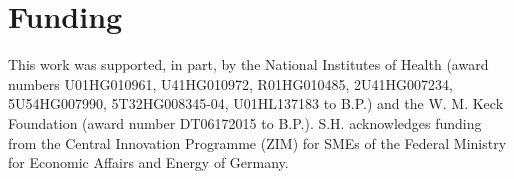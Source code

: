 \documentclass{bioinfo}
\begin{document}
%

\section*{Funding}

This work was supported, in part, by the National Institutes of Health (award numbers U01HG010961, U41HG010972, R01HG010485, 2U41HG007234, 5U54HG007990, 5T32HG008345-04, U01HL137183 to B.P.) and the W. M. Keck Foundation (award number DT06172015 to B.P.).
S.H. acknowledges funding from the Central Innovation Programme (ZIM) for SMEs of the Federal Ministry for Economic Affairs and Energy of Germany.


%
%
%
%
%
%
%











\end{document}
